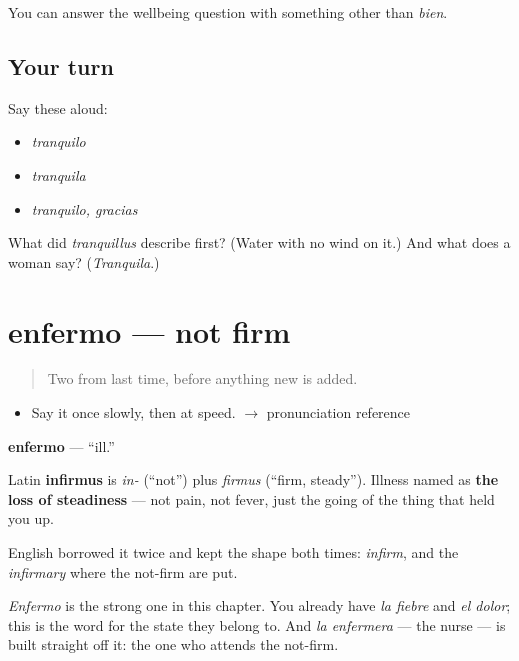 \begin{grammarlens}[title={What you've built}]
You can answer the wellbeing question with something other than \emph{bien}.
\end{grammarlens}

\subsection*{Your turn}
Say these aloud:

\begin{itemize}
\raggedright
  \item \emph{tranquilo}
  \item \emph{tranquila}
  \item \emph{tranquilo, gracias}
\end{itemize}

\begin{tcolorbox}[breakable,colback=teal!4,colframe=teal!35!black,title={Before you move on}]
What did \emph{tranquillus} describe first? (Water with no wind on it.) And what does a woman say? (\emph{Tranquila}.)
\end{tcolorbox}
\section[enfermo]{enfermo — not firm}

\label{lesson:ES-C304-enfermo}



\begin{quote}
Two from last time, before anything new is added.
\end{quote}

\begin{sounds}
\begin{itemize}
\raggedright
  \item Say it once slowly, then at speed. $\to$ pronunciation reference
\end{itemize}
\end{sounds}

\begin{cousinweb}
\textbf{enfermo} — \textquotedblleft{}ill.\textquotedblright{}

Latin \textbf{infirmus} is \emph{in-} (\textquotedblleft{}not\textquotedblright{}) plus \emph{firmus} (\textquotedblleft{}firm, steady\textquotedblright{}). Illness named as \textbf{the loss of steadiness} — not pain, not fever, just the going of the thing that held you up.

English borrowed it twice and kept the shape both times: \emph{infirm}, and the \emph{infirmary} where the not-firm are put.

\emph{Enfermo} is the strong one in this chapter. You already have \emph{la fiebre} and \emph{el dolor}; this is the word for the state they belong to. And \emph{la enfermera} — the nurse — is built straight off it: the one who attends the not-firm.
\end{cousinweb}

